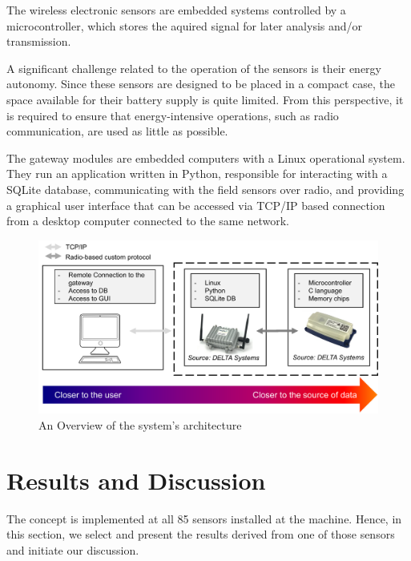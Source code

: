 \documentclass[conference]{IEEEtran}
\begin{document}
The wireless electronic sensors are embedded systems controlled by a microcontroller, which stores the aquired signal for later analysis and/or transmission.

A significant challenge related to the operation of the sensors is their energy autonomy. Since these sensors are designed to be placed in a compact case, the space available for their battery supply is quite limited. From this perspective, it is required to ensure that energy-intensive operations, such as radio communication, are used as little as possible.

The gateway modules are embedded computers with a Linux operational system. They run an application written in Python, responsible for interacting with a SQLite database, communicating with the field sensors over radio, and providing a graphical user interface that can be accessed via TCP/IP based connection from a desktop computer connected to the same network. 

\begin{figure}[htbp]
\centerline{\includegraphics[width=\columnwidth]{graphics/concept/concept_pre_new.pdf}}
\caption{An Overview of the system's architecture}
\label{concept_pre}
\end{figure}

\section{Results and Discussion}
The concept is implemented at all 85 sensors installed at the machine. Hence, in this section, we select and present the results derived from one of those sensors and initiate our discussion. 
\label{sec_results_discussion}
\end{document}
